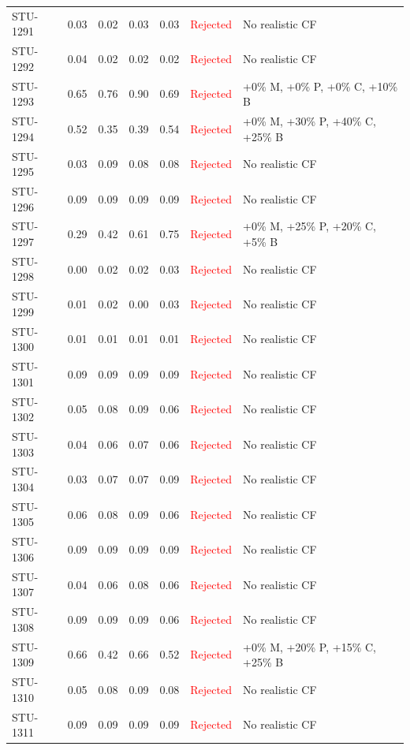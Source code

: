 \begin{longtable}{l c c c c | c | l}
STU-1291 & 0.03 & 0.02 & 0.03 & 0.03 & \textcolor{red}{Rejected} & No realistic CF \\
STU-1292 & 0.04 & 0.02 & 0.02 & 0.02 & \textcolor{red}{Rejected} & No realistic CF \\
STU-1293 & 0.65 & 0.76 & 0.90 & 0.69 & \textcolor{red}{Rejected} & +0\% M, +0\% P, +0\% C, +10\% B \\
STU-1294 & 0.52 & 0.35 & 0.39 & 0.54 & \textcolor{red}{Rejected} & +0\% M, +30\% P, +40\% C, +25\% B \\
STU-1295 & 0.03 & 0.09 & 0.08 & 0.08 & \textcolor{red}{Rejected} & No realistic CF \\
STU-1296 & 0.09 & 0.09 & 0.09 & 0.09 & \textcolor{red}{Rejected} & No realistic CF \\
STU-1297 & 0.29 & 0.42 & 0.61 & 0.75 & \textcolor{red}{Rejected} & +0\% M, +25\% P, +20\% C, +5\% B \\
STU-1298 & 0.00 & 0.02 & 0.02 & 0.03 & \textcolor{red}{Rejected} & No realistic CF \\
STU-1299 & 0.01 & 0.02 & 0.00 & 0.03 & \textcolor{red}{Rejected} & No realistic CF \\
STU-1300 & 0.01 & 0.01 & 0.01 & 0.01 & \textcolor{red}{Rejected} & No realistic CF \\
STU-1301 & 0.09 & 0.09 & 0.09 & 0.09 & \textcolor{red}{Rejected} & No realistic CF \\
STU-1302 & 0.05 & 0.08 & 0.09 & 0.06 & \textcolor{red}{Rejected} & No realistic CF \\
STU-1303 & 0.04 & 0.06 & 0.07 & 0.06 & \textcolor{red}{Rejected} & No realistic CF \\
STU-1304 & 0.03 & 0.07 & 0.07 & 0.09 & \textcolor{red}{Rejected} & No realistic CF \\
STU-1305 & 0.06 & 0.08 & 0.09 & 0.06 & \textcolor{red}{Rejected} & No realistic CF \\
STU-1306 & 0.09 & 0.09 & 0.09 & 0.09 & \textcolor{red}{Rejected} & No realistic CF \\
STU-1307 & 0.04 & 0.06 & 0.08 & 0.06 & \textcolor{red}{Rejected} & No realistic CF \\
STU-1308 & 0.09 & 0.09 & 0.09 & 0.06 & \textcolor{red}{Rejected} & No realistic CF \\
STU-1309 & 0.66 & 0.42 & 0.66 & 0.52 & \textcolor{red}{Rejected} & +0\% M, +20\% P, +15\% C, +25\% B \\
STU-1310 & 0.05 & 0.08 & 0.09 & 0.08 & \textcolor{red}{Rejected} & No realistic CF \\
STU-1311 & 0.09 & 0.09 & 0.09 & 0.09 & \textcolor{red}{Rejected} & No realistic CF \\

\end{longtable}
